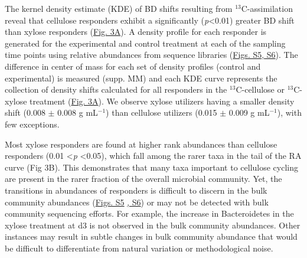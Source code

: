 The kernel density estimate (KDE) of BD shifts resulting from
$^{13}$C-assimilation reveal that cellulose responders exhibit a
significantly (\textit{p}\textless 0.01) greater BD shift than xylose
responders
(\href{https://authorea.com/users/3537/articles/3612/master/file/figures/shift_and_rabund2/shift_and_rabund2.png}{Fig.
3A}). A density profile for each responder is generated for the experimental
and control treatment at each of the sampling time points using relative
abundances from sequence libraries
(\href{https://authorea.com/users/3537/articles/8459/master/file/figures/xylose_resp_profiles/xylose_resp_profiles.png}{Figs.
S5}\href{https://authorea.com/users/3537/articles/8459/master/file/figures/cellulose_resp_profiles/cellulose_resp_profiles.png}{,
S6}). The difference in center of mass for each set of density profiles
(control and experimental) is measured (supp. MM) and each KDE curve represents
the collection of density shifts calculated for all responders in the
$^{13}$C-cellulose or $^{13}$C-xylose treatment
(\href{https://authorea.com/users/3537/articles/3612/master/file/figures/shift_and_rabund2/shift_and_rabund2.png}{Fig.
3A}). We observe xylose utilizers having a smaller density shift (0.008 $\pm$
0.008 g mL$^{-1}$) than cellulose utilizers (0.015 $\pm$ 0.009 g
mL$^{-1}$), with few exceptions. 

Most xylose responders are found at higher rank abundances than cellulose
responders (0.01 \textless \textit{p} \textless 0.05), which fall among the
rarer taxa in the tail of the RA curve (Fig 3B). This demonstrates that many
taxa important to cellulose cycling are present in the rarer fraction of the
overall microbial community. Yet, the transitions in abundances of responders
is difficult to discern in the bulk community abundances
(\href{https://authorea.com/users/3537/articles/8459/master/file/figures/xylose_resp_profiles/xylose_resp_profiles.png}{Figs.
S5}
\href{https://authorea.com/users/3537/articles/8459/master/file/figures/cellulose_resp_profiles/cellulose_resp_profiles.png}{,
S6}) or may not be detected with bulk community sequencing efforts. For
example, the increase in Bacteroidetes in the xylose treatment at d3 is not
observed in the bulk community abundances. Other instances may result in subtle
changes in bulk community abundance that would be difficult to differentiate
from natural variation or methodological noise.


